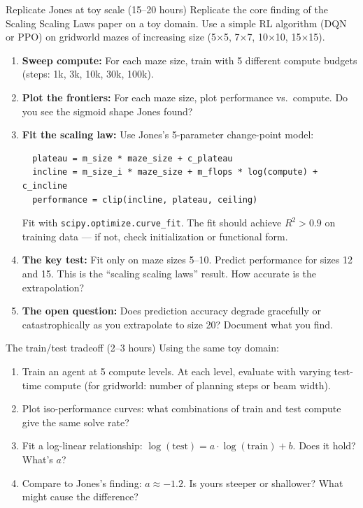 \begin{exercise}{Replicate Jones at toy scale (15--20 hours)}
Replicate the core finding of the Scaling Scaling Laws paper on a toy domain. Use a simple RL algorithm (DQN or PPO) on gridworld mazes of increasing size (5$\times$5, 7$\times$7, 10$\times$10, 15$\times$15).

\begin{enumerate}
  \item \textbf{Sweep compute:} For each maze size, train with 5 different compute budgets (steps: 1k, 3k, 10k, 30k, 100k).
  \item \textbf{Plot the frontiers:} For each maze size, plot performance vs.\ compute. Do you see the sigmoid shape Jones found?
  \item \textbf{Fit the scaling law:} Use Jones's 5-parameter change-point model:
  \begin{lstlisting}
  plateau = m_size * maze_size + c_plateau
  incline = m_size_i * maze_size + m_flops * log(compute) + c_incline
  performance = clip(incline, plateau, ceiling)
  \end{lstlisting}
  Fit with \texttt{scipy.optimize.curve\_fit}. The fit should achieve $R^2 > 0.9$ on training data --- if not, check initialization or functional form.
  \item \textbf{The key test:} Fit only on maze sizes 5--10. Predict performance for sizes 12 and 15. This is the ``scaling scaling laws'' result. How accurate is the extrapolation?
  \item \textbf{The open question:} Does prediction accuracy degrade gracefully or catastrophically as you extrapolate to size 20? Document what you find.
\end{enumerate}
\end{exercise}

\begin{exercise}{The train/test tradeoff (2--3 hours)}
Using the same toy domain:

\begin{enumerate}
  \item Train an agent at 5 compute levels. At each level, evaluate with varying test-time compute (for gridworld: number of planning steps or beam width).
  \item Plot iso-performance curves: what combinations of train and test compute give the same solve rate?
  \item Fit a log-linear relationship: $\log(\text{test}) = a \cdot \log(\text{train}) + b$. Does it hold? What's $a$?
  \item Compare to Jones's finding: $a \approx -1.2$. Is yours steeper or shallower? What might cause the difference?
\end{enumerate}
\end{exercise}

